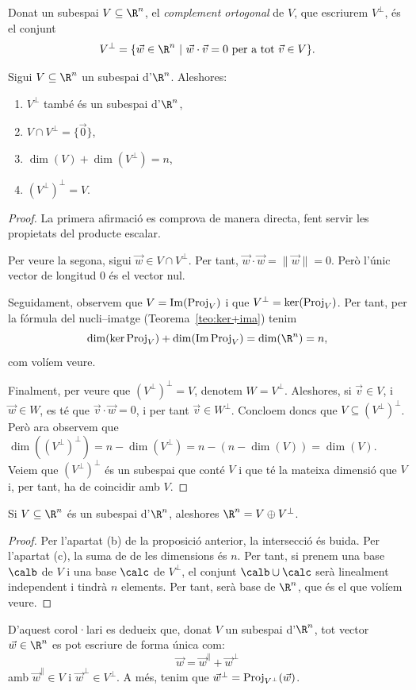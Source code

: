 \begin{definicio}
Donat un subespai $V\subseteq \R^n$, el \emph{complement ortogonal} de $V$, que escriurem $V^\perp$, és el conjunt
\[
V^\perp = \{\vec w\in \R^n ~|~ \vec w\cdot \vec v = 0\text{ per a tot } \vec v\in V\}.
\]
\end{definicio}

\begin{proposicio}
Sigui $V\subseteq \R^n$ un subespai d'$\R^n$. Aleshores:
\begin{enumerate}[\rm (a)]
    \item $V^\perp$ també és un subespai d'$\R^n$,
    \item $V \cap V^\perp = \{\vec 0\}$,
    \item $\dim(V)+\dim(V^\perp) = n$,
    \item $(V^\perp)^\perp = V$.
\end{enumerate}
\end{proposicio}
\begin{proof}
La primera afirmació es comprova de manera directa, fent servir les propietats del producte escalar.

Per veure la segona, sigui $\vec w\in V\cap V^\perp$. Per tant, $\vec w\cdot\vec w =\| \vec w\|= 0$. Però l'únic vector de longitud $0$ és el vector nul.

Seguidament, observem que $V=\operatorname{Im}(\operatorname{Proj}_V)$ i que $V^\perp = \ker(\operatorname{Proj}_V)$. Per tant, per la fórmula del nucli--imatge (Teorema~\ref{teo:ker+ima}) tenim
\[
\dim(\ker\proj_V) + \dim(\Ima\proj_V) = \dim(\R^n)=n,
\]
com volíem veure.

Finalment, per veure que $(V^\perp)^\perp = V$, denotem $W=V^\perp$. Aleshores, si $\vec v\in V$, i $\vec w\in W$, es té que $\vec v\cdot \vec w = 0$, i per tant $\vec v\in W^\perp$. Concloem doncs que $V\subseteq (V^\perp)^\perp$. Però ara observem que $\dim((V^\perp)^\perp) = n - \dim(V^\perp) = n- (n-\dim(V)) = \dim(V)$. Veiem que $(V^\perp)^\perp$ és un subespai que conté $V$ i que té la mateixa dimensió que $V$ i, per tant, ha de coincidir amb $V$.
\end{proof}
\begin{corollari}\label{cor:V+Vper}
Si $V\subseteq\R^n$ és un subespai d'$\R^n$, aleshores $\R^n=V\oplus V^\perp$.
\end{corollari}
\begin{proof}
Per l'apartat (b) de la proposició anterior, la intersecció és buida. Per l'apartat (c), la suma de de les dimensions és $n$. Per tant, si prenem una base $\calb$ de $V$ i una base $\calc$ de $V^\perp$, el conjunt $\calb\cup\calc$ serà linealment independent i tindrà $n$ elements. Per tant, serà base de $\R^n$, que és el que volíem veure.
\end{proof}
D'aquest corol·lari es dedueix que, donat $V$ un subespai d'$\R^n$, tot vector $\vec w\in\R^n$ es pot escriure de forma única com:
\[
\vec w = \vec w^\parallel + \vec w^\perp
\]
amb $\vec w^\parallel \in V$ i $\vec w^\perp \in V^\perp$. A més, tenim que $\vec w^\perp=\operatorname{Proj}_{V^\perp}(\vec w)$.

